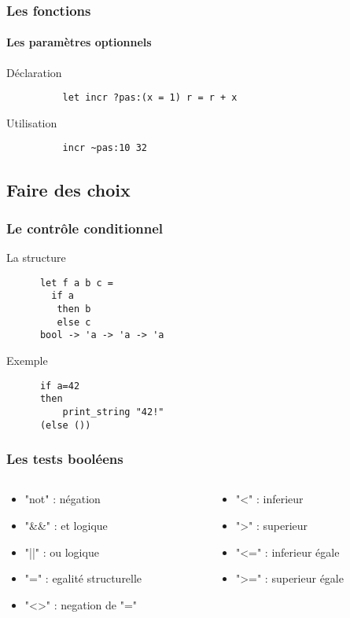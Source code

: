 \begin{frame}[fragile]
	\frametitle{Les fonctions}
	\framesubtitle{Les paramètres optionnels}	

	 	\begin{block}{Déclaration}
		\begin{lstlisting}
		  let incr ?pas:(x = 1) r = r + x
		\end{lstlisting}
		\end{block}

	 	\begin{block}{Utilisation}
		\begin{lstlisting}
		  incr ~pas:10 32
		\end{lstlisting}
		\end{block}

\end{frame}

\subsection{Faire des choix} %
\begin{frame}[fragile]
	\frametitle{Le contrôle conditionnel}
	\begin{block}{La structure}
	\begin{lstlisting}
	  let f a b c = 
	    if a
	     then b 
	     else c
	  bool -> 'a -> 'a -> 'a
	\end{lstlisting}
	\end{block}
	\begin{block}{Exemple}
	\begin{lstlisting}
	  if a=42
  	  then 
    	  print_string "42!" 
  	  (else ())
	\end{lstlisting}
	\end{block}
\end{frame}

\begin{frame}[fragile]
    \frametitle{Les tests booléens}
	\begin{columns}
		\begin{column}{5cm}
			\begin{itemize}
				\item "not" : négation
				\item "\&\&" : et logique
				\item "||" : ou logique
				\item "=" : egalité structurelle
				\item "<>" : negation de "="
			\end{itemize}
		\end{column}
		\begin{column}{5cm}
			\begin{itemize}
				\item "<" : inferieur 
				\item ">" : superieur
				\item "<=" : inferieur égale
				\item ">=" : superieur égale
			\end{itemize}
		\end{column}
	\end{columns}
\end{frame}

